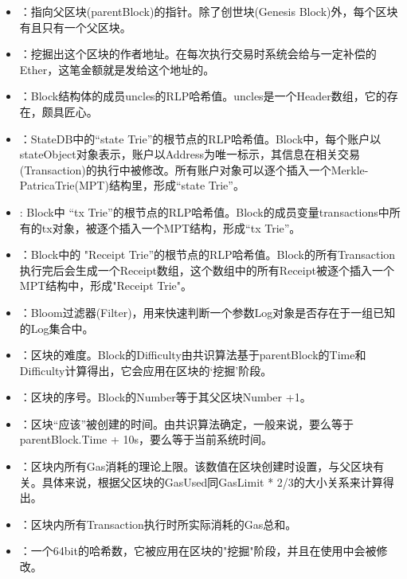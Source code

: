\documentclass[UTF8]{ctexart}
\begin{document}
\begin{itemize}

\item {}：指向父区块(parentBlock)的指针。除了创世块(Genesis Block)外，每个区块有且只有一个父区块。

\item {}：挖掘出这个区块的作者地址。在每次执行交易时系统会给与一定补偿的Ether，这笔金额就是发给这个地址的。

\item {}：Block结构体的成员uncles的RLP哈希值。uncles是一个Header数组，它的存在，颇具匠心。

\item {}：StateDB中的“state Trie”的根节点的RLP哈希值。Block中，每个账户以stateObject对象表示，账户以Address为唯一标示，其信息在相关交易(Transaction)的执行中被修改。所有账户对象可以逐个插入一个Merkle-PatricaTrie(MPT)结构里，形成“state Trie”。

\item {}: Block中 “tx Trie”的根节点的RLP哈希值。Block的成员变量transactions中所有的tx对象，被逐个插入一个MPT结构，形成“tx Trie”。

\item {}：Block中的 "Receipt Trie”的根节点的RLP哈希值。Block的所有Transaction执行完后会生成一个Receipt数组，这个数组中的所有Receipt被逐个插入一个MPT结构中，形成"Receipt Trie"。

\item {}：Bloom过滤器(Filter)，用来快速判断一个参数Log对象是否存在于一组已知的Log集合中。

\item {}：区块的难度。Block的Difficulty由共识算法基于parentBlock的Time和Difficulty计算得出，它会应用在区块的‘挖掘’阶段。

\item {}：区块的序号。Block的Number等于其父区块Number +1。

\item {}：区块“应该”被创建的时间。由共识算法确定，一般来说，要么等于parentBlock.Time + 10s，要么等于当前系统时间。

\item {}：区块内所有Gas消耗的理论上限。该数值在区块创建时设置，与父区块有关。具体来说，根据父区块的GasUsed同GasLimit * 2/3的大小关系来计算得出。

\item {}：区块内所有Transaction执行时所实际消耗的Gas总和。

\item {}：一个64bit的哈希数，它被应用在区块的"挖掘"阶段，并且在使用中会被修改。
\end{itemize}
\end{document}
